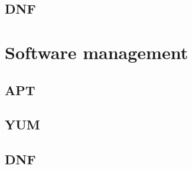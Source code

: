 \documentclass[a4paper,12pt,twoside,openright,titlepage]{book}
\begin{document}
\subsection{DNF}

\section{Software management}

\subsection{APT}

\subsection{YUM}

\subsection{DNF}

\end{document}
